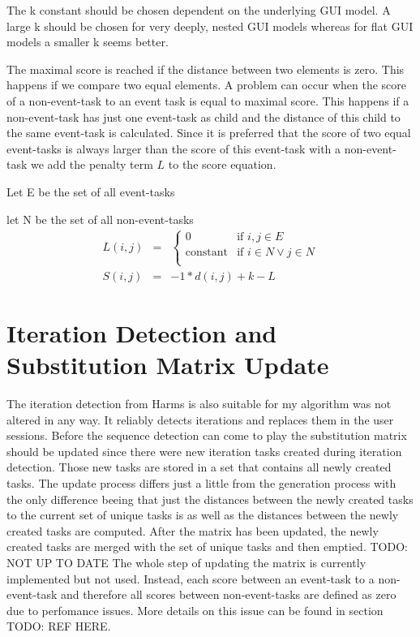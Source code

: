 The k constant should be chosen dependent on the underlying GUI model. A large k should be chosen for very deeply, nested GUI models whereas for flat GUI models a smaller k seems better. 

The maximal score is reached if the distance between two elements is zero. This happens if we compare two equal elements.
A problem can occur when the score of a non-event-task to an event task is equal to maximal score. 
This happens if a non-event-task has just one event-task as child and the distance of this child to the same event-task is calculated. 
Since it is preferred that the score of two equal event-tasks is always larger than the score of this event-task with a non-event-task we add the penalty term $L$ to the score equation.

\begin{definition}
	\item Let E be the set of all event-tasks
	\item let N be the set of all non-event-tasks
\begin{eqnarray*}
	L(i,j) &=& 
	\begin{cases}
		0 & \text{if } i,j \in E \\
		\text{constant} & \text{if } i \in N \lor  j \in N\\
	\end{cases} \\
	S(i,j) &=& -1*d(i,j)+k-L
	\label{eq:subscore_adjusted}
\end{eqnarray*}
\label{def:scoreadjusted}
\end{definition}


\section{Iteration Detection and Substitution Matrix Update}
The iteration detection from Harms is also suitable for my algorithm was not altered in any way. It reliably detects iterations and replaces them in the user sessions.
Before the sequence detection can come to play the substitution matrix should be updated since there were new iteration tasks created during iteration detection. Those new tasks are stored in a set that contains all newly created tasks.
The update process differs just a little from the generation process with the only difference beeing that just the distances between the newly created tasks to the current set of unique tasks is as well as the distances between the newly created tasks are computed.
After the matrix has been updated, the newly created tasks are merged with the set of unique tasks and then emptied.
TODO: NOT UP TO DATE The whole step of updating the matrix is currently implemented but not used. 
Instead, each score between an event-task to a non-event-task and therefore all scores between non-event-tasks are defined as zero due to perfomance issues.
More details on this issue can be found in section TODO: REF HERE.

